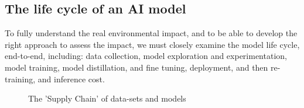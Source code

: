 \subsection{The life cycle of an AI model}
\label{life-cycle}
 To fully understand the real environmental impact, and to be able to develop the right approach to assess the impact, 
 we must closely examine the model life cycle, end-to-end, including: data collection, model exploration and experimentation, model training, model distillation, and fine tuning, deployment, and then re-training, and inference cost. 

\begin{figure}[]
\caption{The 'Supply Chain' of data-sets and models}
  \label{fig:model-life-cycle}
\end{figure}

